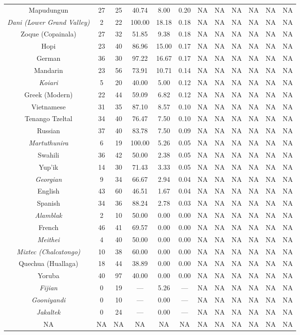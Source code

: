 \begin{tabular}{cccccccccccc}
Mapudungun & 27 & 25 & 40.74 & 8.00 & 0.20 & NA & NA & NA & NA & NA & NA \\
\emph{Dani (Lower Grand Valley)} & 2 & 22 & 100.00 & 18.18 & 0.18 & NA & NA & NA & NA & NA & NA \\
Zoque (Copainala) & 27 & 32 & 51.85 & 9.38 & 0.18 & NA & NA & NA & NA & NA & NA \\
Hopi & 23 & 40 & 86.96 & 15.00 & 0.17 & NA & NA & NA & NA & NA & NA \\
German & 36 & 30 & 97.22 & 16.67 & 0.17 & NA & NA & NA & NA & NA & NA \\
Mandarin & 23 & 56 & 73.91 & 10.71 & 0.14 & NA & NA & NA & NA & NA & NA \\
\emph{Koiari} & 5 & 20 & 40.00 & 5.00 & 0.12 & NA & NA & NA & NA & NA & NA \\
Greek (Modern) & 22 & 44 & 59.09 & 6.82 & 0.12 & NA & NA & NA & NA & NA & NA \\
Vietnamese & 31 & 35 & 87.10 & 8.57 & 0.10 & NA & NA & NA & NA & NA & NA \\
Tenango Tzeltal & 34 & 40 & 76.47 & 7.50 & 0.10 & NA & NA & NA & NA & NA & NA \\
Russian & 37 & 40 & 83.78 & 7.50 & 0.09 & NA & NA & NA & NA & NA & NA \\
\emph{Martuthunira} & 6 & 19 & 100.00 & 5.26 & 0.05 & NA & NA & NA & NA & NA & NA \\
Swahili & 36 & 42 & 50.00 & 2.38 & 0.05 & NA & NA & NA & NA & NA & NA \\
Yup'ik & 14 & 30 & 71.43 & 3.33 & 0.05 & NA & NA & NA & NA & NA & NA \\
\emph{Georgian} & 9 & 34 & 66.67 & 2.94 & 0.04 & NA & NA & NA & NA & NA & NA \\
English & 43 & 60 & 46.51 & 1.67 & 0.04 & NA & NA & NA & NA & NA & NA \\
Spanish & 34 & 36 & 88.24 & 2.78 & 0.03 & NA & NA & NA & NA & NA & NA \\
\emph{Alamblak} & 2 & 10 & 50.00 & 0.00 & 0.00 & NA & NA & NA & NA & NA & NA \\
French & 46 & 41 & 69.57 & 0.00 & 0.00 & NA & NA & NA & NA & NA & NA \\
\emph{Meithei} & 4 & 40 & 50.00 & 0.00 & 0.00 & NA & NA & NA & NA & NA & NA \\
\emph{Mixtec (Chalcatongo)} & 10 & 38 & 60.00 & 0.00 & 0.00 & NA & NA & NA & NA & NA & NA \\
Quechua (Huallaga) & 18 & 44 & 38.89 & 0.00 & 0.00 & NA & NA & NA & NA & NA & NA \\
Yoruba & 40 & 97 & 40.00 & 0.00 & 0.00 & NA & NA & NA & NA & NA & NA \\
\emph{Fijian} & 0 & 19 & --- & 5.26 & --- & NA & NA & NA & NA & NA & NA \\
\emph{Gooniyandi} & 0 & 10 & --- & 0.00 & --- & NA & NA & NA & NA & NA & NA \\
\emph{Jakaltek} & 0 & 24 & --- & 0.00 & --- & NA & NA & NA & NA & NA & NA \\
NA & NA & NA & NA & NA & NA & NA & NA & NA & NA & NA & NA
\end{tabular}